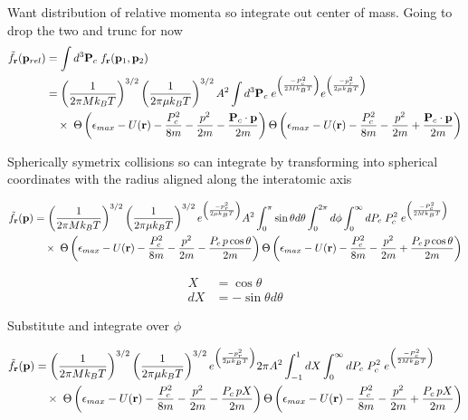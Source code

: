 Want distribution of relative momenta so integrate out center of mass. Going to drop the two and trunc for now
\begin{equation}
\begin{split}
	 \tilde{f}_{\mathbf{r}}(\mathbf{p}_{rel}) & = \int d^3 \mathbf{P}_c \; f_{\mathbf{r}} (\mathbf{p}_1, \mathbf{p}_2) \\
	 &= \left(\frac{1}{2 \pi M k_B T}\right)^{3/2} \left(\frac{1}{2 \pi \mu k_B T}\right)^{3/2} A^2 \int d^3 \mathbf{P}_c \; e^{\left(\frac{-P_c^2}{2 M k_B T}\right)} e^{\left(\frac{-p_r^2}{2 \mu k_B T}\right)} \\ 
	 &\quad \times \; \Theta \left( {\epsilon_{max} - U(\mathbf{r}) - \frac{P_c^2}{8m} - \frac{p^2}{2m} - \frac{\mathbf{P}_c \cdot \mathbf{p}}{2m}} \right) \Theta \left( {\epsilon_{max} - U(\mathbf{r}) - \frac{P_c^2}{8m} - \frac{p^2}{2m} + \frac{\mathbf{P}_c \cdot \mathbf{p}}{2m}} \right) 
\end{split}
\end{equation}

Spherically symetrix collisions so can integrate by transforming into spherical coordinates with the radius aligned along the interatomic axis

\begin{equation}
\begin{split}
	 \tilde{f}_{\mathbf{r}}(\mathbf{p}) &= \left(\frac{1}{2 \pi M k_B T}\right)^{3/2} \left(\frac{1}{2 \pi \mu k_B T}\right)^{3/2} e^{\left(\frac{-p_r^2}{2 \mu k_B T}\right)} A^2  \int_0^{\pi} \sin \theta d\theta \int_0^{2\pi} d\phi \int_0^{\infty} dP_c \; P_c^2 \; e^{\left(\frac{-P_c^2}{2 M k_B T}\right)} \\ 
	 &\quad \times \; \Theta \left( {\epsilon_{max} - U(\mathbf{r}) - \frac{P_c^2}{8m} - \frac{p^2}{2m} - \frac{P_c \, p \cos \theta}{2m}} \right) \Theta \left( {\epsilon_{max} - U(\mathbf{r}) - \frac{P_c^2}{8m} - \frac{p^2}{2m} + \frac{P_c \, p \cos \theta}{2m}} \right) 
\end{split}
\end{equation}

\begin{equation*}
\begin{split}
	X  &= \cos \theta \\
	dX &= - \sin \theta d \theta
\end{split}
\end{equation*}

Substitute and integrate over $\phi$

\begin{equation}
\begin{split}
	 \tilde{f}_{\mathbf{r}}(\mathbf{p}) &= \left(\frac{1}{2 \pi M k_B T}\right)^{3/2} \left(\frac{1}{2 \pi \mu k_B T}\right)^{3/2} e^{\left(\frac{-p_r^2}{2 \mu k_B T}\right)} 2 \pi A^2  \int_{-1}^1 dX \int_0^{\infty} dP_c \; P_c^2 \; e^{\left(\frac{-P_c^2}{2 M k_B T}\right)} \\ 
	 &\quad \times \; \Theta \left( {\epsilon_{max} - U(\mathbf{r}) - \frac{P_c^2}{8m} - \frac{p^2}{2m} - \frac{P_c \, p X}{2m}} \right) \Theta \left( {\epsilon_{max} - U(\mathbf{r}) - \frac{P_c^2}{8m} - \frac{p^2}{2m} + \frac{P_c \, p X}{2m}} \right) 
\end{split}
\end{equation}

